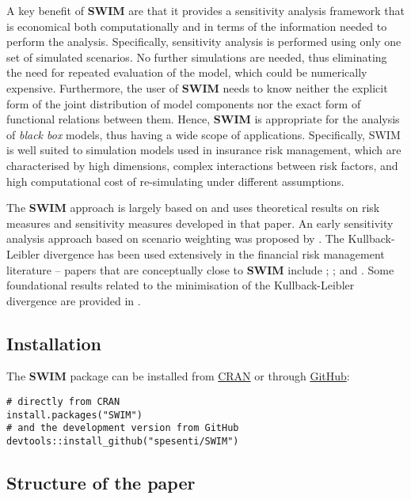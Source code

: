 \documentclass[
]{article}
\begin{document}
A key benefit of \textbf{SWIM} are that it provides a sensitivity analysis framework that is economical both computationally and in terms of the information needed to perform the analysis. Specifically, sensitivity analysis is performed using only one set of simulated scenarios. No further simulations are needed, thus eliminating the need for repeated evaluation of the model, which could be numerically expensive. Furthermore, the user of \textbf{SWIM} needs to know neither the explicit form of the joint distribution of model components nor the exact form of functional relations between them. Hence, \textbf{SWIM} is appropriate for the analysis of \emph{black box} models, thus having a wide scope of applications. Specifically, SWIM is well suited to simulation models used in insurance risk management, which are characterised by high dimensions, complex interactions between risk factors, and high computational cost of re-simulating under different assumptions.

The \textbf{SWIM} approach is largely based on \citet{Pesenti2019} and uses theoretical results on risk measures and sensitivity measures developed in that paper. An early sensitivity analysis approach based on scenario weighting was proposed by \citet{Beckman1987}. The Kullback-Leibler divergence has been used extensively in the financial risk management literature -- papers that are conceptually close to \textbf{SWIM} include \citet{Weber2007}; \citet{Breuer2013}; and \citet{Cambou2017}. Some foundational results related to the minimisation of the Kullback-Leibler divergence are provided in \citet{Csiszar1975dAP}.

\hypertarget{installation}{%
\subsection{Installation}\label{installation}}

The \textbf{SWIM} package can be installed from \href{https://CRAN.R-project.org/package=SWIM}{CRAN} or through \href{https://github.com/spesenti/SWIM}{GitHub}:

\begin{verbatim}
# directly from CRAN
install.packages("SWIM")
# and the development version from GitHub 
devtools::install_github("spesenti/SWIM")
\end{verbatim}

\hypertarget{structure-of-the-paper}{%
\subsection{Structure of the paper}\label{structure-of-the-paper}}
\end{document}
